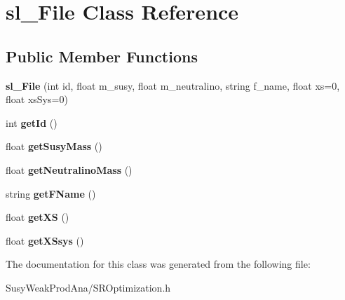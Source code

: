 \hypertarget{classsl__File}{
\section{sl\_\-File Class Reference}
\label{classsl__File}
}
\subsection*{Public Member Functions}
\begin{DoxyCompactItemize}
\item 
\hypertarget{classsl__File_a4b82007051fc943491d4176ef5cf8a6f}{
{\bfseries sl\_\-File} (int id, float m\_\-susy, float m\_\-neutralino, string f\_\-name, float xs=0, float xsSys=0)}
\label{classsl__File_a4b82007051fc943491d4176ef5cf8a6f}

\item 
\hypertarget{classsl__File_a6d607f0faa8917f709622d59e74e9158}{
int {\bfseries getId} ()}
\label{classsl__File_a6d607f0faa8917f709622d59e74e9158}

\item 
\hypertarget{classsl__File_adaeef5c2fbe0f7a83425dfe072b3226e}{
float {\bfseries getSusyMass} ()}
\label{classsl__File_adaeef5c2fbe0f7a83425dfe072b3226e}

\item 
\hypertarget{classsl__File_ae86f3d64d389dec1de380e05aa310507}{
float {\bfseries getNeutralinoMass} ()}
\label{classsl__File_ae86f3d64d389dec1de380e05aa310507}

\item 
\hypertarget{classsl__File_a1d7827232888e25964983bdf1480b5a2}{
string {\bfseries getFName} ()}
\label{classsl__File_a1d7827232888e25964983bdf1480b5a2}

\item 
\hypertarget{classsl__File_a6b0d73263c1f8f014502300096d8320d}{
float {\bfseries getXS} ()}
\label{classsl__File_a6b0d73263c1f8f014502300096d8320d}

\item 
\hypertarget{classsl__File_a220fe7bacdeee19347057e4f652ba9b1}{
float {\bfseries getXSsys} ()}
\label{classsl__File_a220fe7bacdeee19347057e4f652ba9b1}

\end{DoxyCompactItemize}


The documentation for this class was generated from the following file:\begin{DoxyCompactItemize}
\item 
SusyWeakProdAna/SROptimization.h\end{DoxyCompactItemize}
